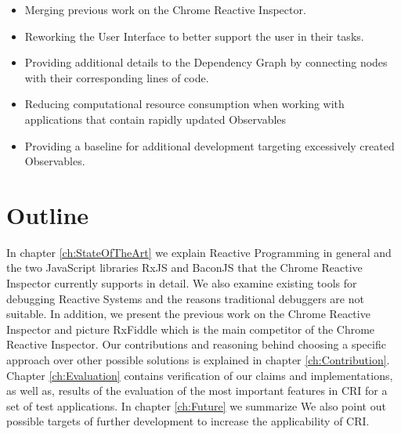 \begin{itemize}
	\item Merging previous work on the Chrome Reactive Inspector.
	\item Reworking the User Interface to better support the user in their tasks.
	\item Providing additional details to the Dependency Graph by connecting nodes with their corresponding lines of code.
	\item Reducing computational resource consumption when working with applications that contain rapidly updated Observables
	\item Providing a baseline for additional development targeting excessively created Observables.
\end{itemize}

\section{Outline}
In chapter \ref{ch:StateOfTheArt} we explain Reactive Programming in general and the two JavaScript libraries RxJS and BaconJS that the Chrome Reactive Inspector currently supports in detail. We also examine existing tools for debugging Reactive Systems and the reasons traditional debuggers are not suitable. In addition, we present the previous work on the Chrome Reactive Inspector and picture RxFiddle which is the main competitor of the Chrome Reactive Inspector.
Our contributions and reasoning behind choosing a specific approach over other possible solutions is explained in chapter \ref{ch:Contribution}.
Chapter \ref{ch:Evaluation} contains verification of our claims and implementations, as well as, results of the evaluation of the most important features in CRI for a set of test applications.
In chapter \ref{ch:Future} we summarize  We also point out possible targets of further development to increase the applicability of CRI.
